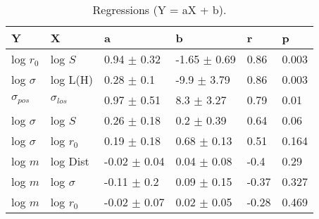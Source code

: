 \begin{table}
\centering
\caption{Regressions (Y = aX + b).}
\begin{tabular}{llllll}
\toprule
              Y &               X &                 a &                 b &      r &      p \\
\midrule
      log $r_0$ &         log $S$ &   0.94 $\pm$ 0.32 &  -1.65 $\pm$ 0.69 &   0.86 &  0.003 \\
   log $\sigma$ &        log L(H) &    0.28 $\pm$ 0.1 &   -9.9 $\pm$ 3.79 &   0.86 &  0.003 \\
 $\sigma_{pos}$ &  $\sigma_{los}$ &   0.97 $\pm$ 0.51 &    8.3 $\pm$ 3.27 &   0.79 &   0.01 \\
   log $\sigma$ &         log $S$ &   0.26 $\pm$ 0.18 &    0.2 $\pm$ 0.39 &   0.64 &   0.06 \\
   log $\sigma$ &     log $r_{0}$ &   0.19 $\pm$ 0.18 &   0.68 $\pm$ 0.13 &   0.51 &  0.164 \\
        log $m$ &        log Dist &  -0.02 $\pm$ 0.04 &   0.04 $\pm$ 0.08 &   -0.4 &   0.29 \\
        log $m$ &    log $\sigma$ &   -0.11 $\pm$ 0.2 &   0.09 $\pm$ 0.15 &  -0.37 &  0.327 \\
        log $m$ &     log $r_{0}$ &  -0.02 $\pm$ 0.07 &   0.02 $\pm$ 0.05 &  -0.28 &  0.469 \\
\bottomrule
\end{tabular}
\end{table}
